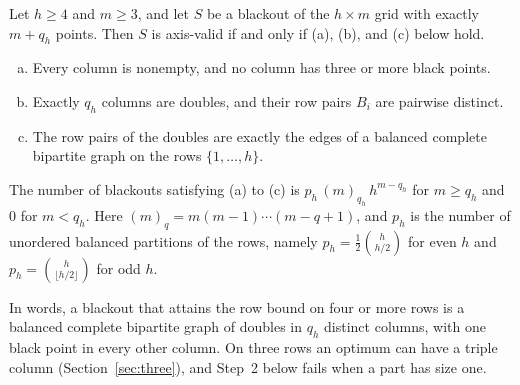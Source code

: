 \begin{theorem}\label{thm:equality}
Let $h\ge4$ and $m\ge3$, and let $S$ be a blackout of the $h\times m$ grid with exactly $m+q_h$ points. Then $S$ is axis-valid if and only if (a), (b), and (c) below hold.
\begin{enumerate}[(a)]
\item Every column is nonempty, and no column has three or more black points.
\item Exactly $q_h$ columns are doubles, and their row pairs $B_i$ are pairwise distinct.
\item The row pairs of the doubles are exactly the edges of a balanced complete bipartite graph on the rows $\{1,\dots,h\}$.
\end{enumerate}
The number of blackouts satisfying (a) to (c) is $p_h\,(m)_{q_h}\,h^{m-q_h}$ for $m\ge q_h$ and $0$ for $m<q_h$. Here $(m)_q=m(m-1)\cdots(m-q+1)$, and $p_h$ is the number of unordered balanced partitions of the rows, namely $p_h=\frac12\binom h{h/2}$ for even $h$ and $p_h=\binom h{\lfloor h/2\rfloor}$ for odd $h$.
\end{theorem}

In words, a blackout that attains the row bound on four or more rows is a balanced complete bipartite graph of doubles in $q_h$ distinct columns, with one black point in every other column. On three rows an optimum can have a triple column (Section~\ref{sec:three}), and Step~2 below fails when a part has size one.


